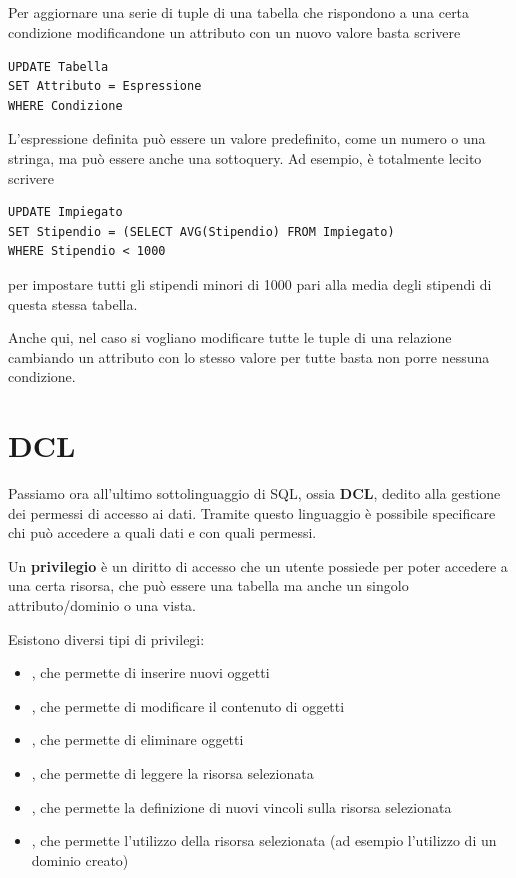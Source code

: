 \documentclass[11pt, a4paper, titlepage, oneside]{scrbook}
\begin{document}
\subsection*{}

Per aggiornare una serie di tuple di una tabella che rispondono a una certa condizione modificandone un attributo con un nuovo valore basta scrivere
\begin{lstlisting}
UPDATE Tabella
SET Attributo = Espressione
WHERE Condizione
\end{lstlisting}

L'espressione definita può essere un valore predefinito, come un numero o una stringa, ma può essere anche una sottoquery. Ad esempio, è totalmente lecito scrivere

\begin{lstlisting}
UPDATE Impiegato
SET Stipendio = (SELECT AVG(Stipendio) FROM Impiegato)
WHERE Stipendio < 1000
\end{lstlisting}

per impostare tutti gli stipendi minori di 1000 pari alla media degli stipendi di questa stessa tabella.

Anche qui, nel caso si vogliano modificare tutte le tuple di una relazione cambiando un attributo con lo stesso valore per tutte basta non porre nessuna condizione.

\section{DCL}

Passiamo ora all'ultimo sottolinguaggio di SQL, ossia \textbf{DCL}, dedito alla gestione dei permessi di accesso ai dati. Tramite questo linguaggio è possibile specificare chi può accedere a quali dati e con quali permessi.

\begin{Definizione}[Privilegio]
\label{def-privilegio}
Un \textbf{privilegio} è un diritto di accesso che un utente possiede per poter accedere a una certa risorsa, che può essere una tabella ma anche un singolo attributo/dominio o una vista.
\end{Definizione}

\begin{Proprieta}
\label{prop-tipi-privilegi}
Esistono diversi tipi di privilegi:
\begin{itemize}
    \item {}, che permette di inserire nuovi oggetti
    \item {}, che permette di modificare il contenuto di oggetti
    \item {}, che permette di eliminare oggetti
    \item {}, che permette di leggere la risorsa selezionata
    \item {}, che permette la definizione di nuovi vincoli sulla risorsa  selezionata
    \item {}, che permette l'utilizzo della risorsa selezionata (ad esempio l'utilizzo di un dominio creato) 
\end{itemize}
\end{Proprieta}
\end{document}
